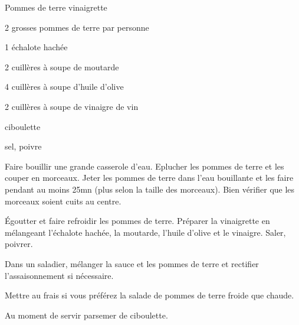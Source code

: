 \begin{recette}{Pommes de terre vinaigrette}
\begin{ingredients}
\item 2 grosses pommes de terre par personne
\item 1 échalote hachée
\item 2 cuillères à soupe de moutarde
\item 4 cuillères à soupe d'huile d'olive
\item 2 cuillères à soupe de vinaigre de vin
\item ciboulette
\item sel, poivre
\end{ingredients}

\begin{preparation}
\item Faire bouillir une grande casserole d'eau. Eplucher les pommes de terre et les couper en morceaux. Jeter les pommes de terre dans l'eau bouillante et les faire pendant au moins 25mn (plus selon la taille des morceaux). Bien vérifier que les morceaux soient cuits au centre.

\item Égoutter et faire refroidir les pommes de terre. Préparer la vinaigrette en mélangeant l'échalote hachée, la moutarde, l'huile d'olive et le vinaigre. Saler, poivrer.

\item Dans un saladier, mélanger la sauce et les pommes de terre et rectifier l'assaisonnement si nécessaire.

\begin{remarque}
Mettre au frais si vous préférez la salade de pommes de terre froide que chaude.
\end{remarque}

\item Au moment de servir parsemer de ciboulette.
\end{preparation}
\end{recette}
